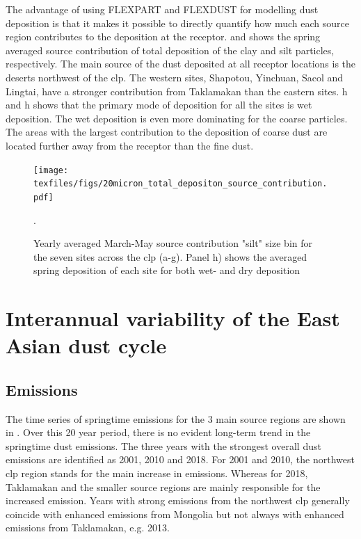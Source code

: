 The advantage of using FLEXPART and FLEXDUST for modelling dust deposition is that it makes it possible to directly quantify how much each source region contributes to the deposition at the receptor.   
 and  shows the spring averaged source contribution of total deposition of the clay and silt particles, respectively. 
The main source of the dust deposited at all receptor locations is the  deserts northwest of the \acrshort{clp}. 
The western sites, Shapotou, Yinchuan, Sacol and Lingtai, have a stronger contribution from Taklamakan than the eastern sites. 
h and h shows that the primary mode of deposition for all the sites is wet deposition.
The wet deposition is even more dominating for the coarse particles. 
The areas with the largest  contribution to the deposition of coarse dust are located further away from the receptor than the fine dust.
 \begin{figure}[htbp]
    \centering
    \texttt{[image: texfiles/figs/20micron\_total\_depositon\_source\_contribution.pdf]}
    \caption{Yearly averaged March-May source contribution "silt" size bin for the seven sites across the \acrshort{clp} (a-g). Panel h) shows the averaged spring deposition of each site for both wet- and dry deposition}.
    \label{fig:source_contrib_20mmu}
\end{figure}

\section{Interannual variability of the East Asian dust cycle}\label{sec:inter_annual_results}

\subsection{Emissions}
The time series of springtime emissions for the 3 main source regions are shown in . Over this 20 year period, there is no evident long-term trend in the springtime dust emissions. 
The three years with the strongest overall dust emissions are identified as 2001, 2010 and 2018. For 2001 and 2010, the northwest \acrshort{clp} region stands for the main increase in emissions.
Whereas for 2018, Taklamakan and the smaller source regions are mainly responsible for the increased emission.
Years with strong emissions from the northwest \acrshort{clp} generally coincide with enhanced emissions from Mongolia but not always with enhanced emissions from Taklamakan, e.g. 2013.   

